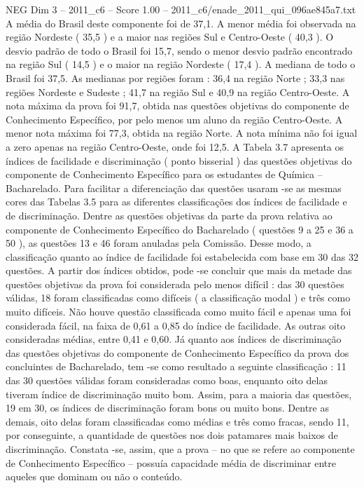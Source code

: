 \begin{textsample}{NEG Dim 3 – 2011\_c6 – Score 1.00 – 2011\_c6/enade\_2011\_qui\_096ae845a7.txt}
A média do Brasil deste componente foi de 37,1.
A menor média foi observada na região Nordeste ( 35,5 ) e a maior nas regiões Sul e Centro-Oeste ( 40,3 ).
O desvio padrão de todo o Brasil foi 15,7, sendo o menor desvio padrão encontrado na região Sul ( 14,5 ) e o maior na região Nordeste ( 17,4 ).
A mediana de todo o Brasil foi 37,5.
As medianas por regiões foram : 36,4 na região Norte ; 33,3 nas regiões Nordeste e Sudeste ; 41,7 na região Sul e 40,9 na região Centro-Oeste.
A nota máxima da prova foi 91,7, obtida nas questões objetivas do componente de Conhecimento Específico, por pelo menos um aluno da região Centro-Oeste.
A menor nota máxima foi 77,3, obtida na região Norte.
A nota mínima não foi igual a zero apenas na região Centro-Oeste, onde foi 12,5.
A Tabela 3.7 apresenta os índices de facilidade e discriminação ( ponto bisserial ) das questões objetivas do componente de Conhecimento Específico para os estudantes de Química – Bacharelado.
Para facilitar a diferenciação das questões usaram -se as mesmas cores das Tabelas 3.5 para as diferentes classificações dos índices de facilidade e de discriminação.
Dentre as questões objetivas da parte da prova relativa ao componente de Conhecimento Específico do Bacharelado ( questões 9 a 25 e 36 a 50 ), as questões 13 e 46 foram anuladas pela Comissão.
Desse modo, a classificação quanto ao índice de facilidade foi estabelecida com base em 30 das 32 questões.
A partir dos índices obtidos, pode -se concluir que mais da metade das questões objetivas da prova foi considerada pelo menos difícil : das 30 questões válidas, 18 foram classificadas como difíceis ( a classificação modal ) e três como muito difíceis.
Não houve questão classificada como muito fácil e apenas uma foi considerada fácil, na faixa de 0,61 a 0,85 do índice de facilidade.
As outras oito consideradas médias, entre 0,41 e 0,60.
Já quanto aos índices de discriminação das questões objetivas do componente de Conhecimento Específico da prova dos concluintes de Bacharelado, tem -se como resultado a seguinte classificação : 11 das 30 questões válidas foram consideradas como boas, enquanto oito delas tiveram índice de discriminação muito bom.
Assim, para a maioria das questões, 19 em 30, os índices de discriminação foram bons ou muito bons.
Dentre as demais, oito delas foram classificadas como médias e três como fracas, sendo 11, por conseguinte, a quantidade de questões nos dois patamares mais baixos de discriminação.
Constata -se, assim, que a prova – no que se refere ao componente de Conhecimento Específico – possuía capacidade média de discriminar entre aqueles que dominam ou não o conteúdo.

\end{textsample}
